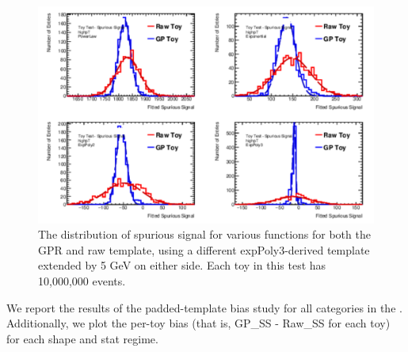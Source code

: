 \begin{figure} 
\begin{center}
  \includegraphics[width=\textwidth]{figures/background/gpr/validation/padded/ToyTest_FitSigVals_highpT_10M_noSig}   
\caption{The distribution of spurious signal for various functions for both the GPR and raw template, using a different expPoly3-derived template extended by 5 GeV on either side. Each toy in this test has 10,000,000 events.}
\label{fig:padded_highpt_10M_noSig}
\end{center}
\end{figure}


We report the results of the padded-template bias study for all categories in the \Tab{\ref{tab:NoSigSSpadded}}. Additionally, we plot the per-toy bias (that is, GP\_SS - Raw\_SS for each toy) for each shape and stat regime.

